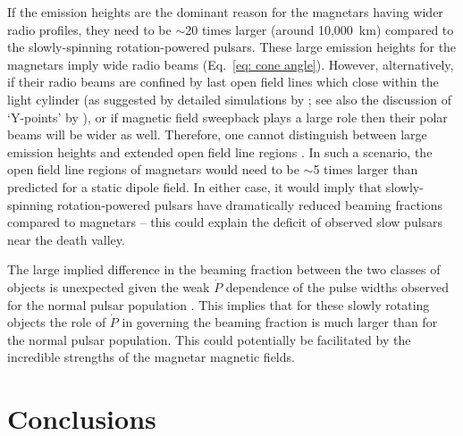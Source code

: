 If the emission heights are the dominant reason for the magnetars having wider radio profiles, they need to be $\sim$20 times larger (around 10,000~km) compared to the slowly-spinning rotation-powered pulsars. These large emission heights for the magnetars imply wide radio beams (Eq.~\ref{eq: cone angle}). However, alternatively, if their radio beams are confined by last open field lines which close within the light cylinder (as suggested by detailed simulations by \citealt{Sxxx2006}; see also the discussion of `Y-points' by \citealt{Cxxx2014}), or if magnetic field sweepback plays a large role \citep[e.g.][]{CRxx2012} then their polar beams will be wider as well. Therefore, one cannot distinguish between large emission heights and extended open field line regions \citep[e.g.][]{RWJx2015b, RWJx2015a}. In such a scenario, the open field line regions of magnetars would need to be $\sim$5 times larger than predicted for a static dipole field. In either case, it would imply that slowly-spinning rotation-powered pulsars have dramatically reduced beaming fractions compared to magnetars -- this could explain the deficit of observed slow pulsars near the death valley.

The large implied difference in the beaming fraction between the two classes of objects is unexpected given the weak $\dot{P}$ dependence of the pulse widths observed for the normal pulsar population \citep[e.g.][]{KGxx2003, JKxx2019}. This implies that for these slowly rotating objects the role of $\dot{P}$ in governing the beaming fraction is much larger than for the normal pulsar population. This could potentially be facilitated by the incredible strengths of the magnetar magnetic fields.


\section{Conclusions}
\label{sec: J0250 - conclusions}

